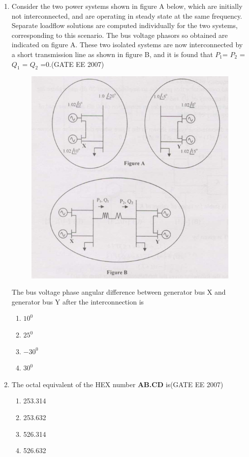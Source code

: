 \documentclass[a4paper,10pt]{exam}
\theoremstyle{remark}
\begin{document}
\begin{enumerate}
\vfill
{}
\newpage

\item  \quad
Consider the two power systems shown in figure A below, which are initially not interconnected, and are operating in steady state at the same frequency. Separate loadflow solutions are computed individually for the two systems, corresponding to this scenario. The bus voltage phasors so obtained are indicated on figure A. These two isolated systems are now interconnected by a short transmission line as shown in figure B, and it is found that  $P_{1}$=  $P_{2}$ =  $Q_{1}$ =  $Q_{2}$ =0.\hfill{(GATE EE 2007)} 

\begin{figure}[H]
    \centering
    \includegraphics[width=0.6\linewidth]{figs/Q 32 2007.png}
\end{figure}

The bus voltage phase angular difference between generator bus X and generator bus Y after the interconnection is

\begin{multicols}{4}
\begin{enumerate}
    \item  $10^{0}$
    \item  $25^{0}$
    \item  $-30^{0}$
    \item  $30^{0}$
    \end{enumerate}
\end{multicols}


\item  \quad The octal equivalent of the HEX number \textbf{AB.CD} is\hfill{(GATE EE 2007)} 

\begin{center}
\begin{multicols}{4}
\begin{enumerate}
\item  253.314
\item  253.632
\item  526.314
\item  526.632
\end{enumerate}
\end{multicols}
\end{center}


\end{enumerate}
\end{document}
